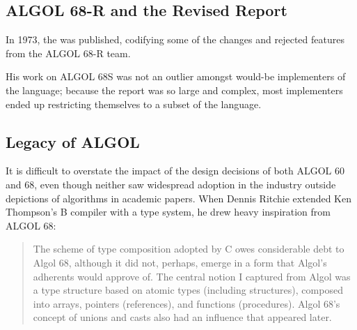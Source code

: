 \subsection{ALGOL 68-R and the Revised Report}

In 1973, the  was published,
codifying some of the changes and rejected features from the ALGOL 68-R team.


His work on ALGOL 68S was not an outlier amongst would-be implementers of the
language; because the report was so large and complex, most
implementers ended up restricting themselves to a subset of the language.





\subsection{Legacy of ALGOL}

It is difficult to overstate the impact of the design decisions of both ALGOL 60 and 68,
even though neither saw widespread adoption in the industry outside depictions of
algorithms in academic papers.
When Dennis Ritchie extended Ken Thompson's B compiler with a type system, he drew heavy
inspiration from ALGOL 68:

\begin{quotation}
	The scheme of type composition adopted by C owes considerable debt to Algol 68,
	although it did not, perhaps, emerge in a form that Algol's adherents would
	approve of. The central notion I captured from Algol was a type structure based
	on atomic types (including structures), composed into arrays, pointers
	(references), and functions (procedures). Algol 68's concept of unions and
	casts also had an influence that appeared later.
	\cite{development_of_c_language_chist_ritchie_1996}
\end{quotation}

